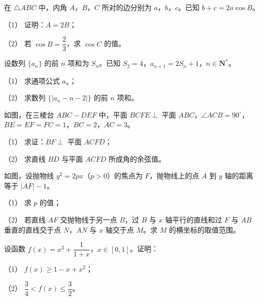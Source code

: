 \begin{question}
在 \(\triangle ABC\) 中，内角 \(A\)，\(B\)，\(C\) 所对的边分别为 \(a\)，\(b\)，\(c\)。已知 \(b+c=2a\cos B\)。

（1） 证明：\(A=2B\)；

（2） 若 \(\cos B=\dfrac{2}{3}\)，求 \(\cos C\) 的值。

\end{question}
\begin{question}
设数列 \(\{a_{n}\}\) 的前 \(n\) 项和为 \(S_{n}\)。已知 \(S_{2}=4\)，\(a_{n+1}=2S_{n}+1\)，\(n\in\mathbf{N}^{*}\)。

（1） 求通项公式 \(a_{n}\)；

（2） 求数列 \(\{|a_{n}-n-2|\}\) 的前 \(n\) 项和。

\Needspace{0.4\textheight}
\end{question}
\begin{question}
如图，在三棱台 \(ABC-DEF\) 中，平面 \(BCFE\perp\) 平面 \(ABC\)，\(\angle ACB=90^{\circ}\)，\(BE=EF=FC=1\)，\(BC=2\)，\(AC=3\)。

（1） 求证：\(BF\perp\) 平面 \(ACFD\)；

（2） 求直线 \(BD\) 与平面 \(ACFD\) 所成角的余弦值。
\nopagebreak[4]
\begin{center}\end{center}
\nopagebreak[4]
\Needspace{0.4\textheight}
\end{question}
\begin{question}
如图，设抛物线 \(y^{2}=2px\)（\(p>0\)）的焦点为 \(F\)，抛物线上的点 \(A\) 到 \(y\) 轴的距离等于 \(|AF|-1\)。

（1） 求 \(p\) 的值；

（2） 若直线 \(AF\) 交抛物线于另一点 \(B\)，过 \(B\) 与 \(x\) 轴平行的直线和过 \(F\) 与 \(AB\) 垂直的直线交于点 \(N\)，\(AN\) 与 \(x\) 轴交于点 \(M\)。求 \(M\) 的横坐标的取值范围。
\nopagebreak[4]
\begin{center}\end{center}
\nopagebreak[4]
\end{question}
\begin{question}
设函数 \(f(x)=x^{3}+\dfrac{1}{1+x}\)，\(x\in[0,1]\)。证明：

（1） \(f(x)\geqslant1-x+x^{2}\)；

（2） \(\dfrac{3}{4}<f(x)\leqslant\dfrac{3}{2}\)。

\end{question}
